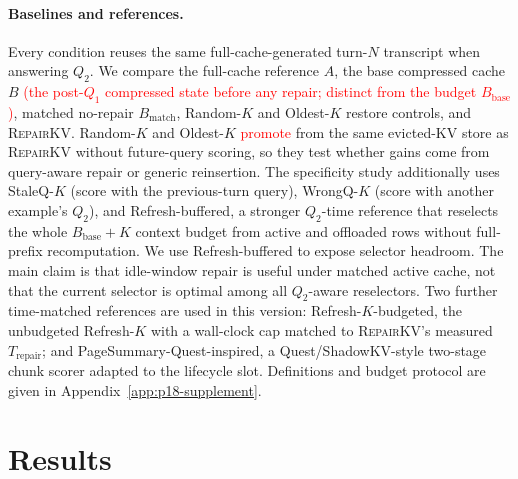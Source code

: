 \documentclass{article}
\newcommand{\repairkv}{\textsc{RepairKV}}
\newcommand{\bbase}{\ensuremath{B_{\mathrm{base}}}}
\newcommand{\bmatch}{\ensuremath{B_{\mathrm{match}}}}
\begin{document}
\paragraph{Baselines and references.}
Every condition reuses the same full-cache-generated turn-$N$
transcript when answering $Q_2$.
We compare the full-cache reference $A$, the base compressed cache $B$
\textcolor{red}{(the post-$Q_1$ compressed state before any repair;
distinct from the budget $\bbase$)}, matched no-repair $\bmatch$,
Random-$K$ and Oldest-$K$ restore controls, and \repairkv{}.
Random-$K$ and Oldest-$K$ \textcolor{red}{promote} from the same evicted-KV store as
\repairkv{} without future-query scoring, so they test whether gains come
from query-aware repair or generic reinsertion.
The specificity study additionally uses StaleQ-$K$ (score with the
previous-turn query), WrongQ-$K$ (score with another example's $Q_2$),
and Refresh-buffered, a stronger $Q_2$-time reference that reselects the
whole $\bbase+K$ context budget from active and offloaded rows without
full-prefix recomputation.
We use Refresh-buffered to expose selector headroom.
The main claim is that idle-window repair is useful under matched active
cache, not that the current selector is optimal among all $Q_2$-aware
reselectors.
\textcolor{green!50!black}{Two further time-matched references are used in this version: Refresh-$K$-budgeted, the unbudgeted Refresh-$K$ with a wall-clock cap matched to \repairkv{}'s measured $T_\text{repair}$; and PageSummary-Quest-inspired, a Quest/ShadowKV-style two-stage chunk scorer adapted to the lifecycle slot. Definitions and budget protocol are given in Appendix~\ref{app:p18-supplement}.}

\section{Results}
\label{sec:results}
\end{document}
